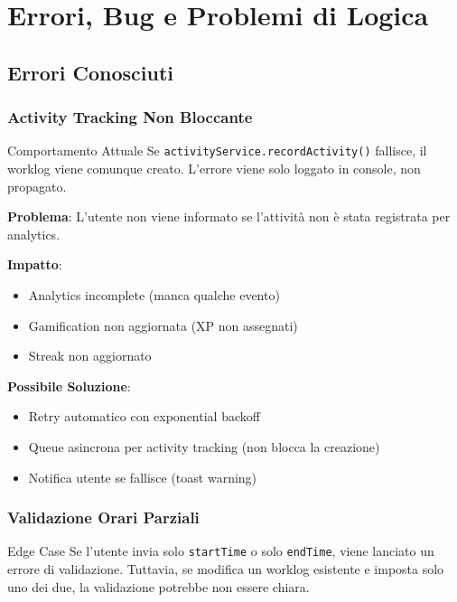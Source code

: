 \documentclass[11pt,a4paper]{article}
\begin{document}
\section{Errori, Bug e Problemi di Logica}

\subsection{Errori Conosciuti}

\subsubsection{Activity Tracking Non Bloccante}

\begin{warningbox}{Comportamento Attuale}
Se \texttt{activityService.recordActivity()} fallisce, il worklog viene comunque creato.
L'errore viene solo loggato in console, non propagato.
\end{warningbox}

\textbf{Problema}: L'utente non viene informato se l'attività non è stata registrata per analytics.

\textbf{Impatto}: 
\begin{itemize}
    \item Analytics incomplete (manca qualche evento)
    \item Gamification non aggiornata (XP non assegnati)
    \item Streak non aggiornato
\end{itemize}

\textbf{Possibile Soluzione}: 
\begin{itemize}
    \item Retry automatico con exponential backoff
    \item Queue asincrona per activity tracking (non blocca la creazione)
    \item Notifica utente se fallisce (toast warning)
\end{itemize}

\subsubsection{Validazione Orari Parziali}

\begin{warningbox}{Edge Case}
Se l'utente invia solo \texttt{startTime} o solo \texttt{endTime}, viene lanciato un errore di validazione.
Tuttavia, se modifica un worklog esistente e imposta solo uno dei due, la validazione potrebbe non essere chiara.
\end{warningbox}
\end{document}
